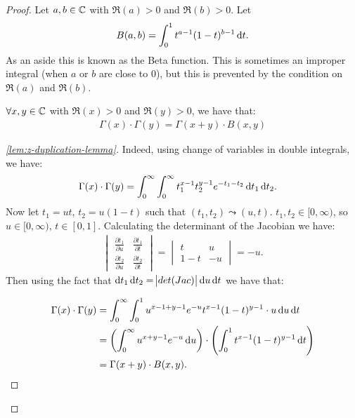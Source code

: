 \begin{proof}
Let $a,b \in \mathbb{C}$ with $\Re(a) > 0$ and $\Re(b) > 0$. Let
\begin{align*}
    B(a,b) = \int_0^1t^{a-1} (1-t)^{b-1} \dif t.
\end{align*}
As an aside this is known as the Beta function. This is sometimes an improper integral (when $a$ or $b$ are close to $0$), but this is prevented by the condition on $\Re(a)$ and $\Re(b)$.

\begin{lemma}\label{lem:z-duplication-lemma}
$ \forall x,y \in \mathbb{C}$ with $\Re(x) > 0$ and $\Re(y) > 0$, we have that:
\begin{align*}
    \Gamma(x) \cdot \Gamma(y) = \Gamma(x+y) \cdot B(x,y)
\end{align*}
\end{lemma}
\begin{proof}[\ref{lem:z-duplication-lemma}]
Indeed, using change of variables in double integrals, we have:
\begin{align*}
    \Gamma(x) \cdot \Gamma(y) &= \int_0^\infty \int_0^\infty t_1^{x-1}t_2^{y-1}  e^{-t_1-t_2} \dif t_1 \dif t_2.
\end{align*}
Now let $t_1 = ut$, $t_2 = u(1-t)$ such that $(t_1, t_2) \leadsto (u,t)$. $t_1, t_2 \in [0,\infty)$, so $u \in [0,\infty), \, t \in [0,1]$. Calculating the determinant of the Jacobian we have:
\begin{align*}
\begin{vmatrix} 
\frac{\partial t_1 }{\partial u} & \frac{\partial t_1 }{\partial t} \\[1ex]
\frac{\partial t_2}{\partial u} & \frac{\partial t_2}{\partial t}
\end{vmatrix} = 
\begin{vmatrix}
t & u\\
1-t & -u
\end{vmatrix} = -u.
\end{align*}
Then using the fact that $\dif t_1 \dif t_2 = \abs{det(Jac)} \dif u \dif t$ we have that:

\begin{align*}
    \Gamma(x) \cdot \Gamma(y) &= \int_0^\infty \int_0^1 u^{x-1+y-1} e^{-u} t^{x-1} (1-t)^{y-1} \cdot u \dif u \dif t\\
    &= \br{\int_0^\infty u^{x+y-1} e^{-u} \dif u } \cdot \br{\int_0^1 t^{x-1} (1-t)^{y-1} \dif t}\\
    &= \Gamma(x+y) \cdot B(x,y).
\end{align*}
\end{proof}


\end{proof}
